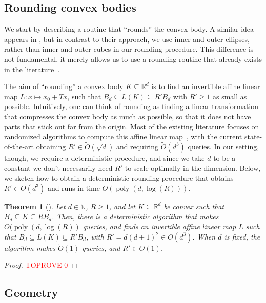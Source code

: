 \documentclass[11pt]{article}
\newtheorem{theorem}{Theorem}[section]
\newcommand{\N}{\ensuremath{\mathbb{N}}}
\newcommand{\R}{\ensuremath{\mathbb{R}}}
\DeclareMathOperator{\poly}{poly}
\begin{document}
    \subsection{Rounding convex bodies}
    \label{subsec:rounding}

    We start by describing a routine that ``rounds'' the convex body. A similar idea appears in \cite{agarwal2004approximating,chan2006faster,yu2008practical}, but in contrast to their approach, we use inner and outer ellipses, rather than inner and outer cubes in our rounding procedure. This difference is not fundamental, it merely allows us to use a rounding routine that already exists in the literature~\cite{grotschel2012geometric}.

    The aim of ``rounding'' a convex body $K \subseteq \R^d$ is to find an invertible affine linear map $L : x \mapsto x_0 + Tx$, such that $B_d \subseteq L(K) \subseteq R'B_d$ with $R' \geq 1$ as small as possible. Intuitively, one can think of rounding as finding a linear transformation that compresses the convex body as much as possible, so that it does not have parts that stick out far from the origin. Most of the existing literature focuses on randomized algorithms to compute this affine linear map~\cite{lovasz2006simulated,jia2021reducing}, with the current state-of-the-art obtaining $R' \in \widetilde{O}(\sqrt{d})$ and requiring $\widetilde{O}(d^3)$ queries. In our setting, though, we require a deterministic procedure, and since we take $d$ to be a constant we don't necessarily need $R'$ to scale optimally in the dimension. Below, we sketch how to obtain a deterministic rounding procedure that obtains $R' \in O(d^3)$ and runs in time $O(\poly(d,\log(R)))$.

    \begin{theorem}[{\cite{grotschel2012geometric}}]
        \label{thm:rounding}
        Let $d \in \N$, $R \geq 1$, and let $K \subseteq \R^d$ be convex such that $B_d \subseteq K \subseteq RB_d$. Then, there is a deterministic algorithm that makes $O(\poly(d,\log(R))$ queries, and finds an invertible affine linear map $L$ such that $B_d \subseteq L(K) \subseteq R'B_d$, with $R' = d(d+1)^2 \in O(d^3)$. When $d$ is fixed, the algorithm makes $\widetilde{O}(1)$ queries, and $R' \in O(1)$.
    \end{theorem}

    \begin{proof}\textcolor{red}{TOPROVE 0}\end{proof}

    \subsection{Geometry}
\end{document}
